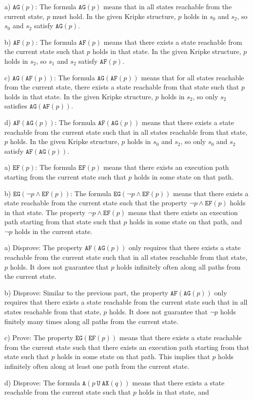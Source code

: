 \documentclass[11pt]{article}
\newcommand{\ax}[1]{\texttt{AX}(#1)}
\newcommand{\af}[1]{\texttt{AF}(#1)}
\newcommand{\ef}[1]{\texttt{EF}(#1)}
\newcommand{\ag}[1]{\texttt{AG}(#1)}
\newcommand{\eg}[1]{\texttt{EG}(#1)}
\newcommand{\au}[2]{\texttt{A}(#1\ \texttt{U}\ #2)}
\begin{document}
a) $\ag{p}$: The formula $\ag{p}$ means that in all states reachable from the current state, $p$ must hold. In the given Kripke structure, $p$ holds in $s_0$ and $s_2$, so $s_0$ and $s_2$ satisfy $\ag{p}$.

b) $\af{p}$: The formula $\af{p}$ means that there exists a state reachable from the current state such that $p$ holds in that state. In the given Kripke structure, $p$ holds in $s_2$, so $s_1$ and $s_2$ satisfy $\af{p}$.

c) $\ag{\af{p}}$: The formula $\ag{\af{p}}$ means that for all states reachable from the current state, there exists a state reachable from that state such that $p$ holds in that state. In the given Kripke structure, $p$ holds in $s_2$, so only $s_2$ satisfies $\ag{\af{p}}$.

d) $\af{\ag{p}}$: The formula $\af{\ag{p}}$ means that there exists a state reachable from the current state such that in all states reachable from that state, $p$ holds. In the given Kripke structure, $p$ holds in $s_0$ and $s_2$, so only $s_0$ and $s_2$ satisfy $\af{\ag{p}}$.

a) $\ef{p}$: The formula $\ef{p}$ means that there exists an execution path starting from the current state such that $p$ holds in some state on that path.

b) $\eg{\neg p \land \ef{p}}$: The formula $\eg{\neg p \land \ef{p}}$ means that there exists a state reachable from the current state such that the property $\neg p \land \ef{p}$ holds in that state. The property $\neg p \land \ef{p}$ means that there exists an execution path starting from that state such that $p$ holds in some state on that path, and $\neg p$ holds in the current state.

a) Disprove: The property $\af{\ag{p}}$ only requires that there exists a state reachable from the current state such that in all states reachable from that state, $p$ holds. It does not guarantee that $p$ holds infinitely often along all paths from the current state.

b) Disprove: Similar to the previous part, the property $\af{\ag{p}}$ only requires that there exists a state reachable from the current state such that in all states reachable from that state, $p$ holds. It does not guarantee that $\neg p$ holds finitely many times along all paths from the current state.

c) Prove: The property $\eg{\ef{p}}$ means that there exists a state reachable from the current state such that there exists an execution path starting from that state such that $p$ holds in some state on that path. This implies that $p$ holds infinitely often along at least one path from the current state.

d) Disprove: The formula $\au{p}{\ax{q}}$ means that there exists a state reachable from the current state such that $p$ holds in that state, and
\end{document}
